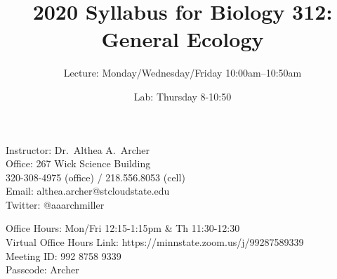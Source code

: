 \documentclass{tufte-handout}
\title{2020 Syllabus for Biology 312: General Ecology}										%
\author{Lecture: Monday/Wednesday/Friday 10:00am--10:50am}										%
\date{Lab: Thursday 8-10:50}
\begin{document}
\maketitle

Instructor: Dr.~Althea A.~Archer\\
Office: 267 Wick Science Building\\
320-308-4975 (office) / 218.556.8053 (cell)\\
Email: althea.archer@stcloudstate.edu\\
Twitter: @aaarchmiller

Office Hours: Mon/Fri 12:15-1:15pm \& Th 11:30-12:30\\
Virtual Office Hours Link: https://minnstate.zoom.us/j/99287589339\\
Meeting ID: 992 8758 9339\\
Passcode: Archer
\end{document}
